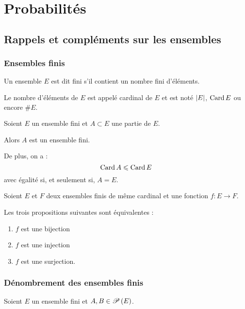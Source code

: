 \chapter{Probabilités}

\minitoc

\section{Rappels et compléments sur les ensembles}

\subsection{Ensembles finis}

\begin{defi}
Un ensemble \(E\) est dit fini s'il contient un nombre fini d'éléments.

Le nombre d'éléments de \(E\) est appelé cardinal de \(E\) et est noté \(\abs{E}\), \(\Card E\) ou encore \(\#E\).
\end{defi}

\begin{theo}
Soient \(E\) un ensemble fini et \(A\subset E\) une partie de \(E\).

Alors \(A\) est un ensemble fini.

De plus, on a : \[\Card A\leq\Card E\] avec égalité si, et seulement si, \(A=E\).
\end{theo}

\begin{theo}
Soient \(E\) et \(F\) deux ensembles finis de même cardinal et une fonction \(f:E\to F\).

Les trois propositions suivantes sont équivalentes :

\begin{enumerate}
    \item \(f\) est une bijection \\
    \item \(f\) est une injection \\
    \item \(f\) est une surjection.
\end{enumerate}
\end{theo}

\subsection{Dénombrement des ensembles finis}

Soient \(E\) un ensemble fini et \(A,B\in\P{E}\).


